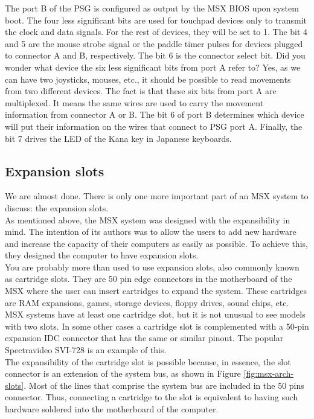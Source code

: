 The port B of the PSG is configured as output by the MSX BIOS upon system boot. The four less significant bits are used for touchpad devices only to transmit the clock and data signals. For the rest of devices, they will be set to 1. The bit 4 and 5 are the mouse strobe signal or the paddle timer pulses for devices plugged to connector A and B, respectively. The bit 6 is the connector select bit. Did you wonder what device the six less significant bits from port A refer to? Yes, as we can have two joysticks, mouses, etc., it should be possible to read movements from two different devices. The fact is that these six bits from port A are multiplexed. It means the same wires are used to carry the movement information from connector A or B. The bit 6 of port B determines which device will put their information on the wires that connect to PSG port A. Finally, the bit 7 drives the LED of the Kana key in Japanese keyboards.

\subsection{Expansion slots}

We are almost done. There is only one more important part of an MSX system to discuss: the expansion slots. \\

As mentioned above, the MSX system was designed with the expansibility in mind. The intention of its authors was to allow the users to add new hardware and increase the capacity of their computers as easily as possible. To achieve this, they designed the computer to have expansion slots. \\

You are probably more than used to use expansion slots, also commonly known as cartridge slots. They are 50 pin edge connectors in the motherboard of the MSX where the user can insert cartridges to expand the system. These cartridges are RAM expansions, games, storage devices, floppy drives, sound chips, etc. MSX systems have at least one cartridge slot, but it is not unusual to see models with two slots. In some other cases a cartridge slot is complemented with a 50-pin expansion IDC connector that has the same or similar pinout. The popular Spectravideo SVI-728 is an example of this. \\

The expansibility of the cartridge slot is possible because, in essence, the slot connector is an extension of the system bus, as shown in Figure \ref{fig:msx-arch-slots}. Most of the lines that comprise the system bus are included in the 50 pins connector. Thus, connecting a cartridge to the slot is equivalent to having such hardware soldered into the motherboard of the computer.

